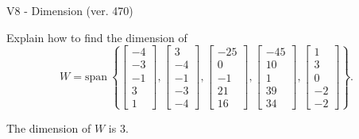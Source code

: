 \begin{exercise}
  \begin{exerciseTitle}V8 - Dimension (ver. 470)\end{exerciseTitle}
  \begin{exerciseStatement}
    Explain how to find the dimension of 
\[W=\mathrm{span}\ \left\{\left[\begin{array}{r}
-4 \\
-3 \\
-1 \\
3 \\
1
\end{array}\right] , \left[\begin{array}{r}
3 \\
-4 \\
-1 \\
-3 \\
-4
\end{array}\right] , \left[\begin{array}{r}
-25 \\
0 \\
-1 \\
21 \\
16
\end{array}\right] , \left[\begin{array}{r}
-45 \\
10 \\
1 \\
39 \\
34
\end{array}\right] , \left[\begin{array}{r}
1 \\
3 \\
0 \\
-2 \\
-2
\end{array}\right]\right\}.\]



  \end{exerciseStatement}
  \begin{exerciseAnswer}
   The dimension of \(W\) is  \(3\).
  


  \end{exerciseAnswer}
\end{exercise}
